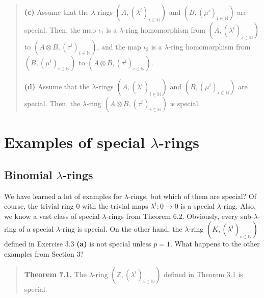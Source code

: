 \documentclass[numbers=enddot,12pt,final,onecolumn,notitlepage]{scrartcl}%
\begin{document}
\begin{quotation}
\textbf{(c)} Assume that the $\lambda$-rings $\left(  A,\left(  \lambda
^{i}\right)  _{i\in\mathbb{N}}\right)  $ and $\left(  B,\left(  \mu
^{i}\right)  _{i\in\mathbb{N}}\right)  $ are special. Then, the map $\iota
_{1}$ is a $\lambda$-ring homomorphism from $\left(  A,\left(  \lambda
^{i}\right)  _{i\in\mathbb{N}}\right)  $ to $\left(  A\otimes B,\left(
\tau^{i}\right)  _{i\in\mathbb{N}}\right)  $, and the map $\iota_{2}$ is a
$\lambda$-ring homomorphism from $\left(  B,\left(  \mu^{i}\right)
_{i\in\mathbb{N}}\right)  $ to $\left(  A\otimes B,\left(  \tau^{i}\right)
_{i\in\mathbb{N}}\right)  $.

\textbf{(d)} Assume that the $\lambda$-rings $\left(  A,\left(  \lambda
^{i}\right)  _{i\in\mathbb{N}}\right)  $ and $\left(  B,\left(  \mu
^{i}\right)  _{i\in\mathbb{N}}\right)  $ are special. Then, the $\lambda$-ring
$\left(  A\otimes B,\left(  \tau^{i}\right)  _{i\in\mathbb{N}}\right)  $ is special.
\end{quotation}

\section{Examples of special $\lambda$-rings}

\subsection{Binomial $\lambda$-rings}

We have learned a lot of examples for $\lambda$-rings, but which of them are
special? Of course, the trivial ring $0$ with the trivial maps $\lambda
^{i}:0\rightarrow0$ is a special $\lambda$-ring. Also, we know a vast class of
special $\lambda$-rings from Theorem 6.2. Obviously, every sub-$\lambda$-ring
of a special $\lambda$-ring is special. On the other hand, the $\lambda$-ring
$\left(  K,\left(  \lambda^{i}\right)  _{i\in\mathbb{N}}\right)  $ defined in
Exercise 3.3 \textbf{(a)} is not special unless $p=1$. What happens to the
other examples from Section 3?

\begin{quote}
\textbf{Theorem 7.1.} The $\lambda$-ring $\left(  \mathbb{Z},\left(
\lambda^{i}\right)  _{i\in\mathbb{N}}\right)  $ defined in Theorem 3.1 is special.
\end{quote}
\end{document}
